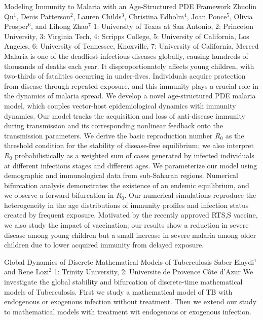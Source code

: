 \vspace{1.5ex}
\abs
{Modeling Immunity to Malaria with an Age-Structured PDE Framework}
{Zhuolin Qu$^{1}$, Denis Patterson$^{2}$, Lauren Childs$^{3}$, Christina Edholm$^{4}$, Joan Ponce$^{5}$, Olivia Prosper$^{6}$, and Lihong Zhao$^{7}$}
{1: University of Texas at San Antonio, 2: Princeton University, 3: Virginia Tech, 4: Scripps College, 5: University of California, Los Angeles, 6: University of Tennessee, Knoxville, 7: University of California, Merced}
{Malaria is one of the deadliest infectious diseases globally, causing hundreds of thousands of deaths each year. It disproportionately affects young children, with two-thirds of fatalities occurring in under-fives. Individuals acquire protection from disease through repeated exposure, and this immunity plays a crucial role in the dynamics of malaria spread. We develop a novel age-structured PDE malaria model, which couples vector-host epidemiological dynamics with immunity dynamics. Our model tracks the acquisition and loss of anti-disease immunity during transmission and its corresponding nonlinear feedback onto the transmission parameters. We derive the basic reproduction number $R_0$ as the threshold condition for the stability of disease-free equilibrium; we also interpret $R_0$ probabilistically as a weighted sum of cases generated by infected individuals at different infectious stages and different ages. We parameterize our model using demographic and immunological data from sub-Saharan regions. Numerical bifurcation analysis demonstrates the existence of an endemic equilibrium, and we observe a forward bifurcation in $R_0$. Our numerical simulations reproduce the heterogeneity in the age distributions of immunity profiles and infection status created by frequent exposure. Motivated by the recently approved RTS,S vaccine, we also study the impact of vaccination; our results show a reduction in severe disease among young children but a small increase in severe malaria among older children due to lower acquired immunity from delayed exposure.}


\vspace{1.5ex}
\abs
{Global Dynamics of Discrete Mathematical Models of Tuberculosis}
{Saber Elaydi$^{1}$ and Rene Lozi$^{2}$}
{1: Trinity University, 2:  Universite de Provence Côte d'Azur}
{We investigate the global stability and bifurcation of discrete-time mathematical models of Tuberculosis. First we study a mathematical model of TB with endogenous or exogenous infection without treatment. Then we extend our study to mathematical models with treatment wit endogenous or exogenous infection.}


